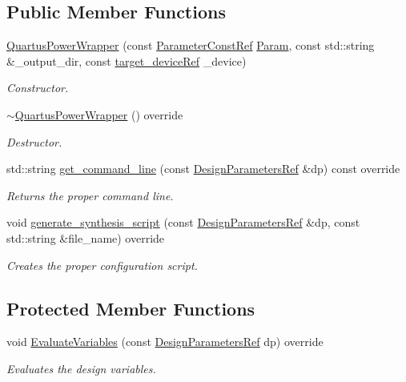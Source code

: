 \subsection*{Public Member Functions}
\begin{DoxyCompactItemize}
\item 
\hyperlink{classQuartusPowerWrapper_a45fce7c49f4dbbb465a08bf761e89653}{Quartus\+Power\+Wrapper} (const \hyperlink{Parameter_8hpp_a37841774a6fcb479b597fdf8955eb4ea}{Parameter\+Const\+Ref} \hyperlink{classSynthesisTool_a854ef102782ff4d069e1aa6d1a94d64e}{Param}, const std\+::string \&\+\_\+output\+\_\+dir, const \hyperlink{target__device_8hpp_acedb2b7a617e27e6354a8049fee44eda}{target\+\_\+device\+Ref} \+\_\+device)
\begin{DoxyCompactList}\small\item\em Constructor. \end{DoxyCompactList}\item 
\hyperlink{classQuartusPowerWrapper_af5c5187b3f8bc0f5f630a9267cf9b661}{$\sim$\+Quartus\+Power\+Wrapper} () override
\begin{DoxyCompactList}\small\item\em Destructor. \end{DoxyCompactList}\item 
std\+::string \hyperlink{classQuartusPowerWrapper_aa1ec11014b508f11b22e8882d53d3cb2}{get\+\_\+command\+\_\+line} (const \hyperlink{DesignParameters_8hpp_ae36bb1c4c9150d0eeecfe1f96f42d157}{Design\+Parameters\+Ref} \&dp) const override
\begin{DoxyCompactList}\small\item\em Returns the proper command line. \end{DoxyCompactList}\item 
void \hyperlink{classQuartusPowerWrapper_acc54508e1f8e353e48faae4e6aeed5de}{generate\+\_\+synthesis\+\_\+script} (const \hyperlink{DesignParameters_8hpp_ae36bb1c4c9150d0eeecfe1f96f42d157}{Design\+Parameters\+Ref} \&dp, const std\+::string \&file\+\_\+name) override
\begin{DoxyCompactList}\small\item\em Creates the proper configuration script. \end{DoxyCompactList}\end{DoxyCompactItemize}
\subsection*{Protected Member Functions}
\begin{DoxyCompactItemize}
\item 
void \hyperlink{classQuartusPowerWrapper_aaa19cb276729799877bb401734c0a0fa}{Evaluate\+Variables} (const \hyperlink{DesignParameters_8hpp_ae36bb1c4c9150d0eeecfe1f96f42d157}{Design\+Parameters\+Ref} dp) override
\begin{DoxyCompactList}\small\item\em Evaluates the design variables. \end{DoxyCompactList}\end{DoxyCompactItemize}
